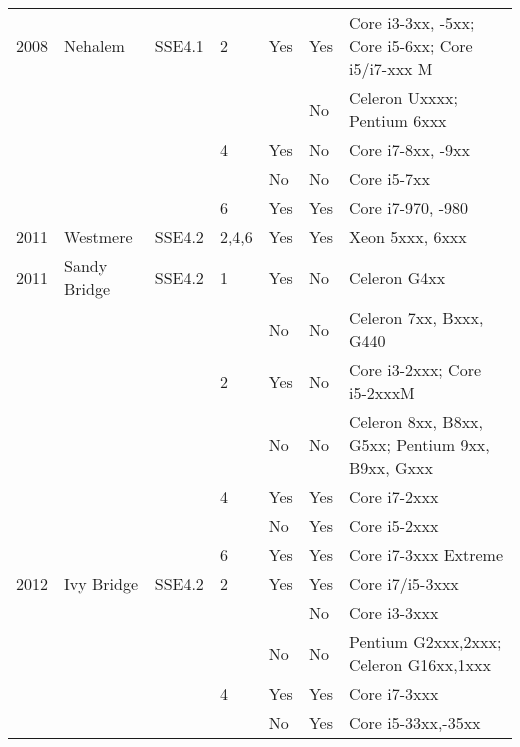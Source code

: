 \begin{longtable}{lllllll}
2008 & Nehalem      & SSE4.1      & 2     & Yes & Yes    & Core i3-3xx, -5xx; Core i5-6xx; Core i5/i7-xxx M \\
     &              &             &       &     & No     & Celeron Uxxxx; Pentium 6xxx                      \\
     &              &             & 4     & Yes & No     & Core i7-8xx, -9xx                                \\
     &              &             &       & No  & No     & Core i5-7xx                                      \\
     &              &             & 6     & Yes & Yes    & Core i7-970, -980                                \\
2011 & Westmere     & SSE4.2      & 2,4,6 & Yes & Yes    & Xeon 5xxx, 6xxx                                  \\
2011 & Sandy Bridge & SSE4.2      & 1     & Yes & No     & Celeron G4xx                                     \\
     &              &             &       & No  & No     & Celeron 7xx, Bxxx, G440                          \\
     &              &             & 2     & Yes & No     & Core i3-2xxx; Core i5-2xxxM                      \\
     &              &             &       & No  & No     & Celeron 8xx, B8xx, G5xx; Pentium 9xx, B9xx, Gxxx \\
     &              &             & 4     & Yes & Yes    & Core i7-2xxx                                     \\
     &              &             &       & No  & Yes    & Core i5-2xxx                                     \\
     &              &             & 6     & Yes & Yes    & Core i7-3xxx Extreme                             \\
2012 & Ivy Bridge   & SSE4.2      & 2     & Yes & Yes    & Core i7/i5-3xxx                                  \\
     &              &             &       &     & No     & Core i3-3xxx                                     \\
     &              &             &       & No  & No     & Pentium G2xxx,2xxx; Celeron G16xx,1xxx           \\
     &              &             & 4     & Yes & Yes    & Core i7-3xxx                                     \\
     &              &             &       & No  & Yes    & Core i5-33xx,-35xx                               \\

\end{longtable}
